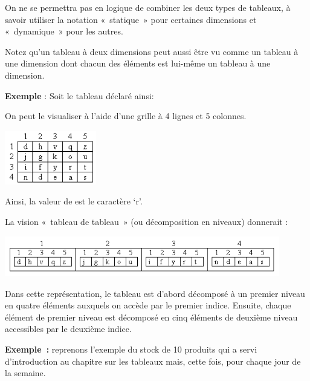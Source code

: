 	
	
	On ne se permettra pas en logique de
	combiner les deux types de tableaux, à savoir utiliser la notation
	«~statique~» pour certaines dimensions et «~dynamique~» pour les
	autres.

	Notez qu'un tableau à deux dimensions peut aussi être
	vu comme un tableau à une dimension dont chacun des éléments est
	lui-même un tableau à une dimension.

	\textbf{Exemple} : Soit le tableau déclaré ainsi:


	On peut le visualiser à l’aide d’une grille à 4 lignes et 5 colonnes.

	\begin{center}
	\includegraphics[width=4cm]{image/tab2d-vision-tab2d}
	\end{center}

	Ainsi, la valeur de  
	est le caractère ‘r’. 
	
	La vision «~tableau de tableau~» 
	(ou décomposition en niveaux)
	donnerait :

	\begin{center}
	\includegraphics[width=0.9\textwidth]{image/tab2d-vision-tabtab}
	\end{center}

	Dans cette représentation, le tableau  est
	d’abord décomposé à un premier niveau en quatre éléments auxquels on
	accède par le premier indice. Ensuite, chaque élément de premier niveau
	est décomposé en cinq éléments de deuxième niveau accessibles par le
	deuxième indice.
	
	\textbf{Exemple~:} reprenons l'exemple du stock de 10 produits
	qui a servi d'introduction au chapitre sur les tableaux
	mais, cette fois, pour chaque jour de la semaine.
	
